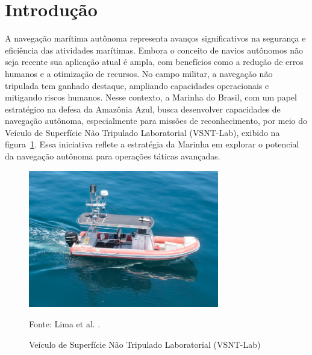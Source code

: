 \section{Introdução}

A navegação marítima autônoma representa avanços significativos na segurança e eficiência das atividades marítimas. Embora o conceito de navios autônomos não seja recente sua aplicação atual é ampla, com benefícios como a redução de erros humanos e a otimização de recursos. No campo militar, a navegação não tripulada tem ganhado destaque, ampliando capacidades operacionais e mitigando riscos humanos. Nesse contexto, a Marinha do Brasil, com um papel estratégico na defesa da Amazônia Azul, busca desenvolver capacidades de navegação autônoma, especialmente para missões de reconhecimento, por meio do Veículo de Superfície Não Tripulado Laboratorial (VSNT-Lab), exibido na figura~\ref{fig:intro_vsnt}. Essa iniciativa reflete a estratégia da Marinha em explorar o potencial da navegação autônoma para operações táticas avançadas\cite{VSNT_douglas2024}.

\begin{figure}[H]
    \caption{Veículo de Superfície Não Tripulado Laboratorial (VSNT-Lab)}
       \centering
       \includegraphics[height=6cm]{figuras/intro_vsnt.png}
       \label{fig:intro_vsnt}
   \small
   
   Fonte: Lima et al. \cite{VSNT_douglas2024}.
   \end{figure}

